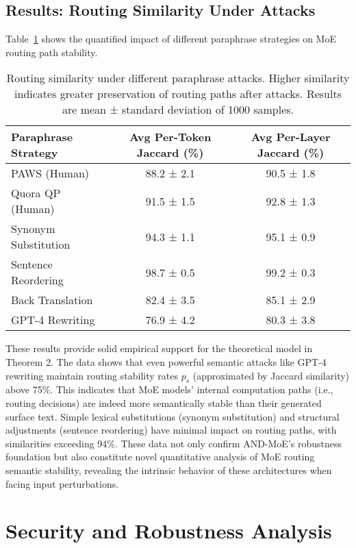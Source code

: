 \documentclass[letterpaper,twocolumn,10pt]{article}
\begin{document}
\subsection{Results: Routing Similarity Under Attacks}

Table~\ref{tab:routing_similarity} shows the quantified impact of different paraphrase strategies on MoE routing path stability.

\begin{table}[h]
\centering
\small
\begin{tabular}{|l|c|c|}
\hline
\textbf{Paraphrase Strategy} & \textbf{Avg Per-Token Jaccard (\%)} & \textbf{Avg Per-Layer Jaccard (\%)} \\
\hline
PAWS (Human) & 88.2 ± 2.1 & 90.5 ± 1.8 \\
Quora QP (Human) & 91.5 ± 1.5 & 92.8 ± 1.3 \\
Synonym Substitution & 94.3 ± 1.1 & 95.1 ± 0.9 \\
Sentence Reordering & 98.7 ± 0.5 & 99.2 ± 0.3 \\
Back Translation & 82.4 ± 3.5 & 85.1 ± 2.9 \\
GPT-4 Rewriting & 76.9 ± 4.2 & 80.3 ± 3.8 \\
\hline
\end{tabular}
\caption{Routing similarity under different paraphrase attacks. Higher similarity indicates greater preservation of routing paths after attacks. Results are mean ± standard deviation of 1000 samples.}
\label{tab:routing_similarity}
\end{table}

These results provide solid empirical support for the theoretical model in Theorem 2. The data shows that even powerful semantic attacks like GPT-4 rewriting maintain routing stability rates $p_s$ (approximated by Jaccard similarity) above 75\%. This indicates that MoE models' internal computation paths (i.e., routing decisions) are indeed more semantically stable than their generated surface text. Simple lexical substitutions (synonym substitution) and structural adjustments (sentence reordering) have minimal impact on routing paths, with similarities exceeding 94\%. These data not only confirm AND-MoE's robustness foundation but also constitute novel quantitative analysis of MoE routing semantic stability, revealing the intrinsic behavior of these architectures when facing input perturbations.

\section{Security and Robustness Analysis}
\end{document}
